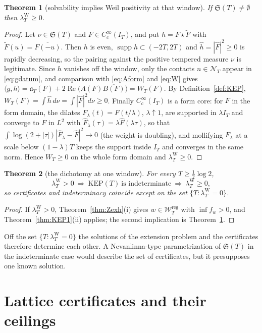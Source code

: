 \documentclass[11pt]{amsart}
\newtheorem{theorem}{Theorem}[section]
\theoremstyle{definition}
\theoremstyle{remark}
\newcommand{\Rel}{\operatorname{Re}}
\newcommand{\supp}{\operatorname{supp}}
\newcommand{\IT}{I_T}
\newcommand{\lamW}{\lambda^{\mathrm W}_T}
\newcommand{\Fh}{\widehat F}
\newcommand{\Wcl}{\mathcal W_T}
\newcommand{\NT}{\mathcal N_T}
\begin{document}
\begin{theorem}[solvability implies Weil positivity at that window]\label{thm:KEP2}
If $\mathfrak S(T)\ne\emptyset$ then $\lamW\ge0$.
\end{theorem}
\begin{proof}
Let $\nu\in\mathfrak S(T)$ and $F\in C_c^\infty(\IT)$, and put $h=F\star\widetilde F$ with
$\widetilde F(u)=\overline{F(-u)}$. Then $h$ is even, $\supp h\subset(-2T,2T)$ and
$\widehat h=|\Fh|^2\ge0$ is rapidly decreasing, so the pairing against the positive tempered measure
$\nu$ is legitimate. Since $h$ vanishes off the window, only the contacts $n\in\NT$ appear in
\eqref{eq:gdatum}, and comparison with \eqref{eq:Aform} and \eqref{eq:W} gives
$\langle g,h\rangle=\mathfrak a_T(F)+2\Rel\big(A(F)\overline{B(F)}\big)=W_T(F)$. By
Definition~\ref{def:KEP}, $W_T(F)=\int\widehat h\,d\nu=\int|\Fh|^2d\nu\ge0$. Finally
$C_c^\infty(\IT)$ is a form core: for $F$ in the form domain, the dilates $F_\lambda(t)=F(t/\lambda)$,
$\lambda\uparrow1$, are supported in $\lambda\IT$ and converge to $F$ in $L^2$ with
$\Fh_\lambda(\tau)=\lambda\Fh(\lambda\tau)$, so that
$\int\log(2+|\tau|)|\Fh_\lambda-\Fh|^2\to0$ (the weight is doubling), and mollifying $F_\lambda$ at a
scale below $(1-\lambda)T$ keeps the support inside $\IT$ and converges in the same norm. Hence
$W_T\ge0$ on the whole form domain and $\lamW\ge0$.
\end{proof}

\begin{theorem}[the dichotomy at one window]\label{thm:KEPdich}
For every $T\ge\frac12\log2$,
\[
\lamW>0\ \Longrightarrow\ \mathrm{KEP}(T)\ \text{is indeterminate}\ \Longrightarrow\ \lamW\ge0 ,
\]
so certificates and indeterminacy coincide except on the set $\{T:\lamW=0\}$.
\end{theorem}
\begin{proof}
If $\lamW>0$, Theorem~\ref{thm:Zexh}(i) gives $w\in\Wcl^{\mathrm{reg}}$ with $\inf f_w>0$, and
Theorem~\ref{thm:KEP1}(ii) applies; the second implication is Theorem~\ref{thm:KEP2}.
\end{proof}

Off the set $\{T:\lamW=0\}$ the solutions of the extension problem and the certificates therefore
determine each other. A Nevanlinna-type parametrization of $\mathfrak S(T)$ in the indeterminate case
would describe the set of certificates, but it presupposes one known solution.


\section{Lattice certificates and their ceilings}\label{sec:class}
\end{document}
